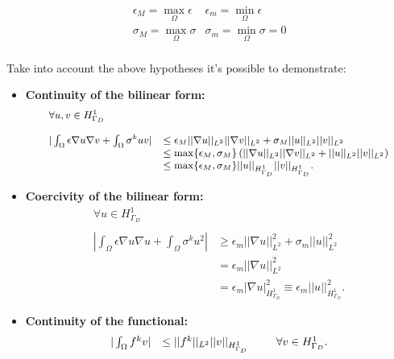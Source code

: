 \begin{equation*}
\begin{array}{ll}
\epsilon_M = \max_{\Omega} \epsilon & \epsilon_m = \min_{\Omega} \epsilon \\
\sigma_M = \max_{\Omega} \sigma & \sigma_m = \min_{\Omega} \sigma = 0 \\
\end{array}
\end{equation*}

Take into account the above hypotheses it's possible to demonstrate:
\begin{itemize}
\item \textbf{Continuity of the bilinear form:}
\begin{equation*}
\small
\begin{array}{ll}
\forall u,v \in H^1_{\Gamma_D} &\\ \\
|\int_{\Omega} \epsilon \nabla u \nabla v + \int_{\Omega} \sigma^{k}u v| 
& \leq \epsilon_{M} ||\nabla u ||_{L^2} || \nabla v ||_{L^2} +  \sigma_{M} ||u ||_{L^2} ||v ||_{L^2} 
\\
& \leq \max\{\epsilon_{M}, \sigma_{M} \}  
\left( ||\nabla u ||_{L^2} || \nabla v ||_{L^2} +   ||u ||_{L^2} ||v ||_{L^2} \right)
\\
& \leq \max\{\epsilon_{M}, \sigma_{M} \}  
||u ||_{H^1_{\Gamma_D}} || v ||_{H^1_{\Gamma_D}}.
\end{array}
\end{equation*}

\item \textbf{Coercivity of the bilinear form:}
\begin{equation*}
\begin{array}{ll}
\forall u \in H^1_{\Gamma_D} &\\ \\
|\int_{\Omega} \epsilon \nabla u \nabla u + \int_{\Omega} \sigma^{k}u^2| 
& \geq \epsilon_{m} ||\nabla u ||_{L^2}^2  +  \sigma_{m} ||u ||_{L^2}^2 
\\
& =  \epsilon_{m} ||\nabla u ||_{L^2}^2 
\\
& = \epsilon_{m} |\nabla u |_{H^1_{\Gamma_D}}^2 \equiv \epsilon_m ||u||^2_{H^1_{\Gamma_D}} .
\end{array}
\end{equation*}

\item \textbf{Continuity of the functional:}
\begin{equation*}
\begin{array}{ll}
|\int_{\Omega} f^{k} v |
& \leq ||f^{k} ||_{L^2}||v ||_{H^1_{\Gamma_D}} \psp{15} \forall v \in H^1_{\Gamma_D}.
\end{array}
\end{equation*}
\end{itemize}

